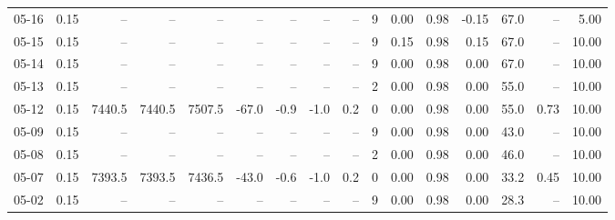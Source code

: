 \begin{threeparttable}
{\begin{tabular}{lrrrrrrrrrrrrrrr}
  05-16 &     0.15 &     -- &     -- &     -- &         -- &             -- &                       -- &                  -- &              9 &       0.00 &      0.98 &          -0.15 &             67.0 &              -- &                   5.00 \\
  05-15 &     0.15 &     -- &     -- &     -- &         -- &             -- &                       -- &                  -- &              9 &       0.15 &      0.98 &           0.15 &             67.0 &              -- &                  10.00 \\
  05-14 &     0.15 &     -- &     -- &     -- &         -- &             -- &                       -- &                  -- &              9 &       0.00 &      0.98 &           0.00 &             67.0 &              -- &                  10.00 \\
  05-13 &     0.15 &     -- &     -- &     -- &         -- &             -- &                       -- &                  -- &              2 &       0.00 &      0.98 &           0.00 &             55.0 &              -- &                  10.00 \\
  05-12 &     0.15 & 7440.5 & 7440.5 & 7507.5 &      -67.0 &           -0.9 &                     -1.0 &                 0.2 &              0 &       0.00 &      0.98 &           0.00 &             55.0 &            0.73 &                  10.00 \\
  05-09 &     0.15 &     -- &     -- &     -- &         -- &             -- &                       -- &                  -- &              9 &       0.00 &      0.98 &           0.00 &             43.0 &              -- &                  10.00 \\
  05-08 &     0.15 &     -- &     -- &     -- &         -- &             -- &                       -- &                  -- &              2 &       0.00 &      0.98 &           0.00 &             46.0 &              -- &                  10.00 \\
  05-07 &     0.15 & 7393.5 & 7393.5 & 7436.5 &      -43.0 &           -0.6 &                     -1.0 &                 0.2 &              0 &       0.00 &      0.98 &           0.00 &             33.2 &            0.45 &                  10.00 \\
  05-02 &     0.15 &     -- &     -- &     -- &         -- &             -- &                       -- &                  -- &              9 &       0.00 &      0.98 &           0.00 &             28.3 &              -- &                  10.00 \\

\end{tabular}}
\end{threeparttable}

